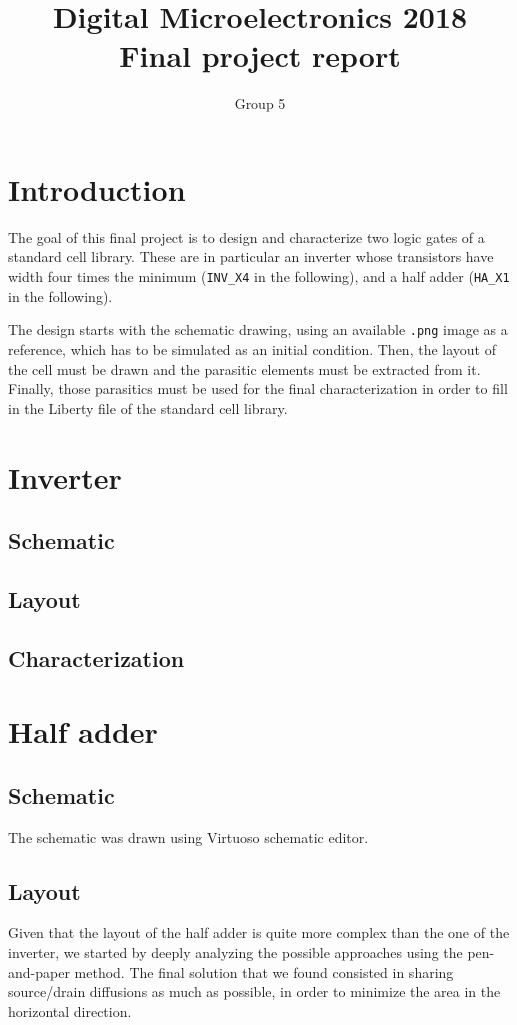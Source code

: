 \documentclass[a4paper]{article}
\title{Digital Microelectronics 2018 \\ Final project report}
\author{Group 5}
\newcommand{\inv}{\texttt{INV\_X4}\xspace}
\newcommand{\ha}{\texttt{HA\_X1}\xspace}
\begin{document}
\maketitle

\section{Introduction}
The goal of this final project is to design and characterize two logic gates of a standard cell library. These are in particular an inverter whose transistors have width four times the minimum (\inv in the following), and a half adder (\ha in the following).

The design starts with the schematic drawing, using an available \texttt{.png} image as a reference, which has to be simulated as an initial condition. Then, the layout of the cell must be drawn and the parasitic elements must be extracted from it. Finally, those parasitics must be used for the final characterization in order to fill in the Liberty file of the standard cell library.

\section{Inverter}
\subsection{Schematic}


\subsection{Layout}
\subsection{Characterization}

\section{Half adder}
\subsection{Schematic}
The schematic was drawn using Virtuoso schematic editor. 

\subsection{Layout}
Given that the layout of the half adder is quite more complex than the one of the inverter, we started by deeply analyzing the possible approaches using the pen-and-paper method. The final solution that we found consisted in sharing source/drain diffusions as much as possible, in order to minimize the area in the horizontal direction.
\end{document}

